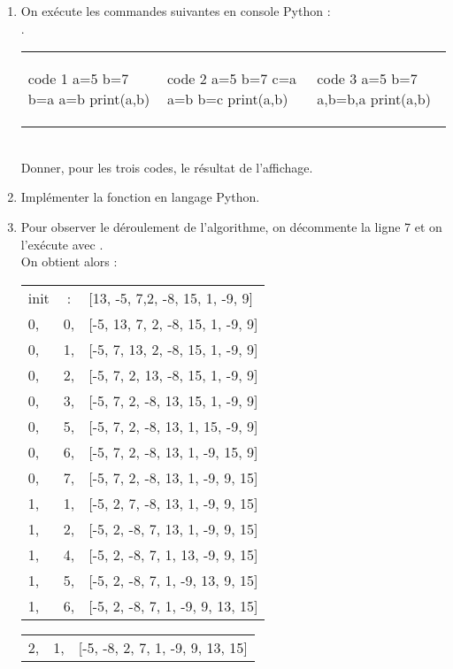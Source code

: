 \documentclass[11pt,a4paper,french,twoside]{PMCours}
\begin{document}
\begin{enumerate}
\item On exécute les commandes suivantes en console Python :\medskip\\
. \hskip -1cm \begin{tabular}{p{5cm}p{5cm}p{5cm}}
\begin{Python}
code 1
a=5
b=7
b=a
a=b
print(a,b)
\end{Python} 
&
\begin{Python}
code 2
a=5
b=7
c=a
a=b
b=c
print(a,b)
\end{Python} 
&
\begin{Python}
code 3
a=5
b=7
a,b=b,a
print(a,b)
\end{Python} 
\end{tabular}\\
Donner, pour les trois codes, le résultat de l'affichage.
\item Implémenter la fonction  en langage Python.
\item Pour observer le déroulement de l'algorithme, on décommente la ligne 7 et on 
l'exécute avec .\\
On obtient alors :
\begin{multicols}{2}
\begin{tabular}{lcl}
 init & :  & [13, -5, 7,2, -8, 15, 1, -9, 9]\\
0,& 0,& [-5, 13, 7, 2, -8, 15, 1, -9, 9]\\
0,& 1,& [-5, 7, 13, 2, -8, 15, 1, -9, 9]\\
0,& 2,& [-5, 7, 2, 13, -8, 15, 1, -9, 9]\\
0,& 3,& [-5, 7, 2, -8, 13, 15, 1, -9, 9]\\
0,& 5,& [-5, 7, 2, -8, 13, 1, 15, -9, 9]\\
0,& 6,& [-5, 7, 2, -8, 13, 1, -9, 15, 9]\\
0,& 7,& [-5, 7, 2, -8, 13, 1, -9, 9, 15]\\
1,& 1,& [-5, 2, 7, -8, 13, 1, -9, 9, 15]\\
1,& 2,& [-5, 2, -8, 7, 13, 1, -9, 9, 15]\\
1,& 4,& [-5, 2, -8, 7, 1, 13, -9, 9, 15]\\
1,& 5,& [-5, 2, -8, 7, 1, -9, 13, 9, 15]\\
1,& 6,& [-5, 2, -8, 7, 1, -9, 9, 13, 15]\\
\end{tabular}
\begin{tabular}{lcl}
2,& 1,& [-5, -8, 2, 7, 1, -9, 9, 13, 15]\\

\end{tabular}
\end{multicols}
\end{enumerate}
\end{document}
